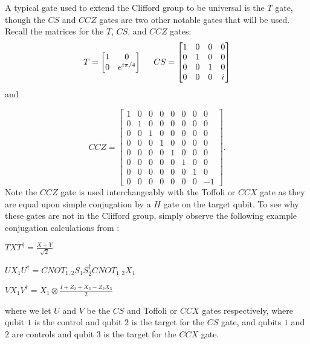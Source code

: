 \documentclass[12pt]{dalthesis}
\begin{document}
A typical gate used to extend the Clifford group to be universal is the $T$ gate, though the $CS$ and $CCZ$ gates are two other notable gates that will be used. Recall the matrices for the $T$, $CS$, and $CCZ$ gates:
\begin{equation*}
T = 
\begin{bmatrix}
1 & 0 \\
0 & e^{i\pi/4}
\end{bmatrix}
\hspace{5mm}
CS = 
\begin{bmatrix}
1 & 0 & 0 & 0 \\
0 & 1 & 0 & 0 \\
0 & 0 & 1 & 0 \\
0 & 0 & 0 & i \\
\end{bmatrix}
\end{equation*}
and

\begin{equation*}
CCZ = 
\begin{bmatrix}
1 & 0 & 0 & 0 & 0 & 0 & 0 & 0 \\
0 & 1 & 0 & 0 & 0 & 0 & 0 & 0 \\
0 & 0 & 1 & 0 & 0 & 0 & 0 & 0 \\
0 & 0 & 0 & 1 & 0 & 0 & 0 & 0 \\
0 & 0 & 0 & 0 & 1 & 0 & 0 & 0 \\
0 & 0 & 0 & 0 & 0 & 1 & 0 & 0 \\
0 & 0 & 0 & 0 & 0 & 0 & 1 & 0 \\
0 & 0 & 0 & 0 & 0 & 0 & 0 & -1 
\end{bmatrix}.
\end{equation*}
Note the $CCZ$ gate is used interchangeably with the Toffoli or $CCX$ gate as they are equal upon simple conjugation by a $H$ gate on the target qubit. To see why these gates are not in the Clifford group, simply observe the following example conjugation calculations from \cite{beverland2019lower}:
\begin{center}
$TXT^{\dag} = \frac{X+Y}{\sqrt{2}}$
\end{center}
\begin{center}
$UX_1U^{\dag} = CNOT_{1,2}S_1S_2^{\dag}CNOT_{1, 2}X_1$
\end{center}
\begin{center}
$VX_1V^{\dag} = X_1 \otimes \frac{I + Z_2 +X_3 -Z_2X_3}{2}$
\end{center}
where we let $U$ and $V$ be the $CS$ and Toffoli or $CCX$ gates respectively, where qubit $1$ is the control and qubit $2$ is the target for the $CS$ gate, and qubits $1$ and $2$ are controls and qubit $3$ is the target for the $CCX$ gate. 
\end{document}
